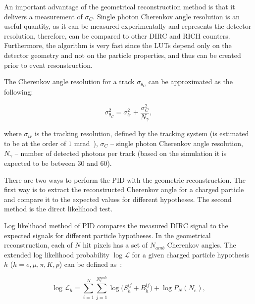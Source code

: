 An important advantage of the geometrical reconstruction method is that it delivers a measurement of $\sigma_{C}$. Single photon Cherenkov angle resolution is an useful quantity, as it can be measured experimentally and represents the detector resolution, therefore, can be compared to other DIRC and RICH counters. Furthermore, the algorithm is very fast since the LUTs depend only on the detector geometry and not on the particle properties, and thus can be created prior to event resonstruction.

The Cherenkov angle resolution for a track $\sigma_{\theta_{C}}$ can be approximated as the following:

\begin{equation}
\sigma^{2}_{\theta_{C}} = \sigma^{2}_{tr} + \frac{\sigma^{2}_{C}}{N_{\gamma}},
\end{equation}

\noindent where $\sigma_{tr}$ is the tracking resolution, defined by the tracking system (is estimated to be at the order of $1$ mrad~\cite{tdr}), $\sigma_{C}$ -- single photon Cherenkov angle resolution, $N_{\gamma}$ -- number of detected photons per track (based on the simulation it is expected to be between 30 and 60).

There are two ways to perform the PID with the geometric reconstruction. The first way is to extract the reconstructed Cherenkov angle for a charged particle and compare it to the expected values for different hypotheses. The second method is the direct likelihood test.

Log likelihood method of PID compares the measured DIRC signal to the expected signals for different particle hypotheses. In the geometrical reconstruction, each of $N$ hit pixels has a set of $N_{amb}$ Cherenkov angles. The extended log likelihood probability $\log\mathcal{L}$ for a given charged particle hypothesis $h$ ($h = e, \mu, \pi, K, p$) can be defined as~\cite{staric2}:

\begin{equation}
\log\mathcal{L}_{h} = \sum_{i=1}^{N} \sum_{j=1}^{N^{amb}_{i}} \log \Big( S_{h}^{ij} + B_{h}^{ij} \Big) + \log P_{N}(N_{e}),
\label{eq:ll}
\end{equation}

